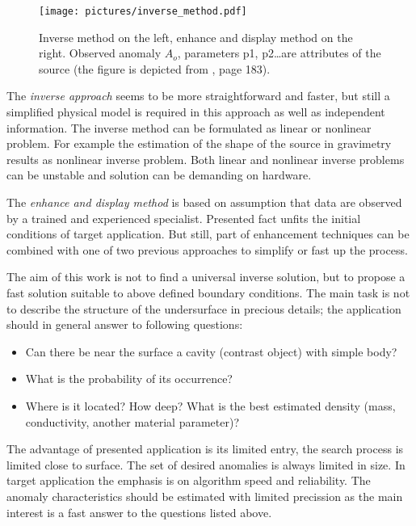 \documentclass[FM]{tulthesis}
\begin{document}
\begin{figure}[ht]
\centerline{\texttt{[image: pictures/inverse\_method.pdf]}}
\renewcommand{\figurename}{Figure}
\caption[Inverse method]{Inverse method on the left, enhance and display method on the right. Observed anomaly $A_{o}$, parameters p1, p2\dots are attributes of the source (the figure is depicted from \cite{Blakely}, page 183).}
\label{fig:InverseMethod}
\end{figure}

The \emph{inverse approach} seems to be more straightforward and faster, but still a simplified physical model is required in this approach as well as independent information. The inverse method can be formulated as linear or nonlinear problem. For example the estimation of the shape of the source in gravimetry results as nonlinear inverse problem. Both linear and nonlinear inverse problems can be unstable and solution can be demanding on hardware. 

The \emph{enhance and display method} is based on assumption that data are observed by a trained and experienced specialist. Presented fact unfits the initial conditions of target application. But still, part of enhancement techniques can be combined with one of two previous approaches to simplify or fast up the process.


The aim of this work is not to find a universal inverse solution, but to propose a fast solution suitable to above defined boundary conditions. The main task is not to describe the structure of the undersurface in precious details; the application should in general answer to following questions: 

\pagebreak

\begin{itemize}
\item Can there be near the surface a cavity (contrast object) with simple body? 
\item What is the probability of its occurrence?
\item Where is it located? How deep? What is the best estimated density (mass, conductivity, another material parameter)? 
\end{itemize}

The advantage of presented application is its limited entry, the search process is limited close to surface. The set of desired anomalies is always limited in size. In target application the emphasis is on algorithm speed and reliability. The anomaly characteristics should be estimated with limited precission as the main interest is a fast answer to the questions listed above.
\end{document}
